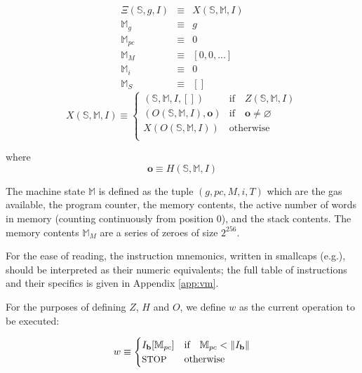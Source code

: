 \documentclass[9pt,oneside]{amsart}
\makeatletter
\newcommand*\eg{e.g.\@\xspace}
\makeatother
\begin{document}
\begin{multicols}{2}
\begin{eqnarray}
\Xi(\mathbb{S}, g, I) & \equiv & X(\mathbb{S}, \mathbb{M}, I) \\
\mathbb{M}_g & \equiv & g \\
\mathbb{M}_{pc} & \equiv & 0 \\
\mathbb{M}_M & \equiv & [0, 0, ...] \\
\mathbb{M}_i & \equiv & 0 \\
\mathbb{M}_S & \equiv & []
\end{eqnarray}
\begin{equation}
X(\mathbb{S}, \mathbb{M}, I) \equiv \begin{cases}
(\mathbb{S}, \mathbb{M}, I, []) & \text{if} \quad Z(\mathbb{S}, \mathbb{M}, I)\\
(O(\mathbb{S}, \mathbb{M}, I), \mathbf{o}) & \text{if} \quad \mathbf{o} \neq \varnothing\\
X(O(\mathbb{S}, \mathbb{M}, I)) & \text{otherwise}\\
\end{cases}
\end{equation}

where
\begin{equation}
\mathbf{o} \equiv H(\mathbb{S}, \mathbb{M}, I)
\end{equation}

The machine state $\mathbb{M}$ is defined as the tuple $(g, pc, M, i, T)$ which are the gas available, the program counter, the memory contents, the active number of words in memory (counting continuously from position 0), and the stack contents. The memory contents $\mathbb{M}_M$ are a series of zeroes of size $2^{256}$.

For the ease of reading, the instruction mnemonics, written in smallcaps (\eg {}), should be interpreted as their numeric equivalents; the full table of instructions and their specifics is given in Appendix \ref{app:vm}.

For the purposes of defining $Z$, $H$ and $O$, we define $w$ as the current operation to be executed:

\begin{equation}
w \equiv \begin{cases} I_\mathbf{b}[\mathbb{M}_{pc}] & \text{if} \quad \mathbb{M}_{pc} < \lVert I_\mathbf{b} \rVert \\
\text{\small STOP} & \text{otherwise}
\end{cases}
\end{equation}


\end{multicols}
\end{document}
